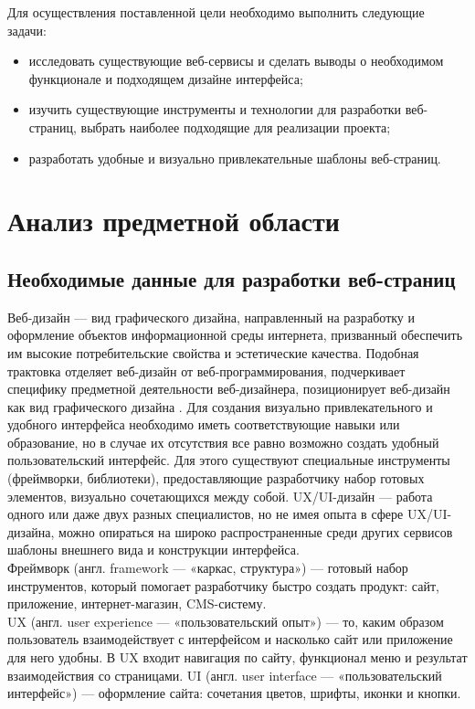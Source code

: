 \documentclass[a4paper,12pt]{article}
\begin{document}
Для осуществления поставленной цели необходимо выполнить следующие задачи:
\begin{itemize}
	\item исследовать существующие веб-сервисы и сделать выводы о необходимом функционале и подходящем дизайне интерфейса;
	\item изучить существующие инструменты и технологии для разработки веб-страниц, выбрать наиболее подходящие для реализации проекта;
	\item разработать удобные и визуально привлекательные шаблоны веб-страниц.
\end{itemize}





\newpage
\section{Анализ предметной области}
\subsection{Необходимые данные для разработки веб-страниц}

Веб-дизайн — вид графического дизайна, направленный на разработку и оформление объектов информационной среды интернета, призванный обеспечить им высокие потребительские свойства и эстетические качества. Подобная трактовка отделяет веб-дизайн от веб-программирования, подчеркивает специфику предметной деятельности веб-дизайнера, позиционирует веб-дизайн как вид графического дизайна \cite{book:web}. Для создания визуально привлекательного и удобного интерфейса необходимо иметь соответствующие навыки или образование, но в случае их отсутствия все равно возможно создать удобный пользовательский интерфейс. Для этого существуют специальные инструменты (фреймворки, библиотеки), предоставляющие разработчику набор готовых элементов, визуально сочетающихся между собой. UX/UI-дизайн — работа одного или даже двух разных специалистов, но не имея опыта в сфере UX/UI-дизайна, можно опираться на широко распространенные среди других сервисов шаблоны внешнего вида и конструкции интерфейса.\\
Фреймворк (англ. framework — «каркас, структура») — готовый набор инструментов, который помогает разработчику быстро создать продукт: сайт, приложение, интернет-магазин, CMS-систему. \cite{website:yandex1}\\
UX (англ. user experience — «пользовательский опыт») — то, каким образом пользователь взаимодействует с интерфейсом и насколько сайт или приложение для него удобны. В UX входит навигация по сайту, функционал меню и результат взаимодействия со страницами. UI (англ. user interface — «пользовательский интерфейс») — оформление сайта: сочетания цветов, шрифты, иконки и кнопки. \cite{website:skillbox1}\\
\end{document}
